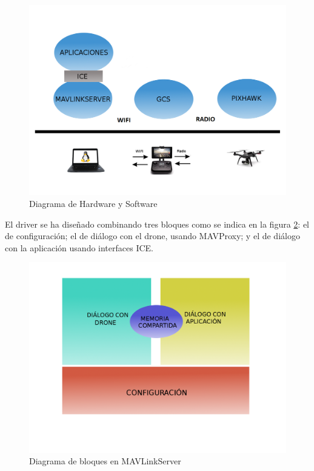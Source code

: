 \begin{figure}[H]
  \centering
  \includegraphics[scale=0.3]{imagenes/HWYSW.png}
  \caption{Diagrama de Hardware y Software}
  \label{fig:diagramaHwSw}
\end{figure}

El driver se ha diseñado combinando tres bloques como se indica en la figura \ref{fig:memoriaCompartida}: el de configuración; el de diálogo con el drone, usando MAVProxy; y el de diálogo con la aplicación usando interfaces ICE.

\begin{figure}[H]
  \centering
  \includegraphics[scale=0.16]{imagenes/MEMORIACOMPARTIDA.png}
  \caption{Diagrama de bloques en MAVLinkServer}
  \label{fig:memoriaCompartida}
\end{figure}

